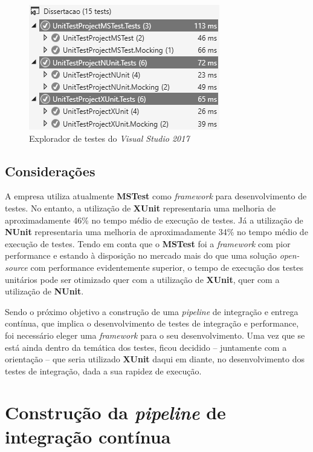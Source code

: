 \begin{figure}[hbt!]
\centering
\includegraphics[width=0.5\linewidth]{Cap5/TestExplorer.png}
\caption{Explorador de testes do \textit{Visual Studio 2017}}
\label{Fig:Fig9}
\end{figure}

\subsection{Considerações}

\hspace{1cm}A empresa utiliza atualmente \textbf{MSTest} como \textit{framework} para desenvolvimento de testes. No entanto, a utilização de \textbf{XUnit} representaria uma melhoria de aproximadamente 46\% no tempo médio de execução de testes. Já a utilização de \textbf{NUnit} representaria uma melhoria de aproximadamente 34\% no tempo médio de execução de testes. Tendo em conta que o \textbf{MSTest} foi a \textit{framework} com pior performance e estando à disposição no mercado mais do que uma solução \textit{open-source} com performance evidentemente superior, o tempo de execução dos testes unitários pode ser otimizado quer com a utilização de \textbf{XUnit}, quer com a utilização de \textbf{NUnit}.

\hspace{1cm}Sendo o próximo objetivo a construção de uma \textit{pipeline} de integração e entrega contínua, que implica o desenvolvimento de testes de integração e performance, foi necessário eleger uma \textit{framework} para o seu desenvolvimento. Uma vez que se está ainda dentro da temática dos testes, ficou decidido -- juntamente com a orientação -- que seria utilizado \textbf{XUnit} daqui em diante, no desenvolvimento dos testes de integração, dada a sua rapidez de execução.

\section{Construção da \textit{pipeline} de integração contínua}

